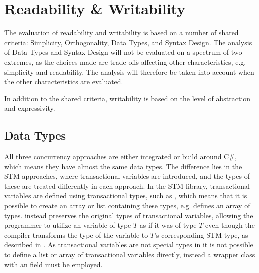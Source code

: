 \section{Readability \& Writability}\label{subsec:tl_charac_read_and_write}
The evaluation of readability and writability is based on a number of shared criteria: Simplicity, Orthogonality, Data Types, and Syntax Design. The analysis of Data Types and Syntax Design will not be evaluated on a spectrum of two extremes, as the choices made are trade offs affecting other characteristics, e.g. simplicity and readability. The analysis will therefore be taken into account when the other characteristics are evaluated.

In addition to the shared criteria, writability is based on the level of abstraction and expressivity.
\subsection{Data Types}\label{subsec:datatypes}
All three concurrency approaches are either integrated or build around C\#, which means they have almost the same data types. The difference lies in the \ac{STM} approaches, where transactional variables are introduced, and the types of these are treated differently in each approach. In the \ac{STM} library, transactional variables are defined using transactional types, such as , which means that it is possible to create an array or list containing these types, e.g.  defines an array of  types. \stmname instead  preserves the original types of transactional variables, allowing the programmer to utilize an  variable of type $T$ as if it was of type $T$ even though the compiler transforms the type of the variable to $T$'s corresponding \ac{STM} type, as described in . As transactional variables are not special types in \stmname it is not possible to define a list or array of transactional variables directly, instead a wrapper class with an  field must be employed.

